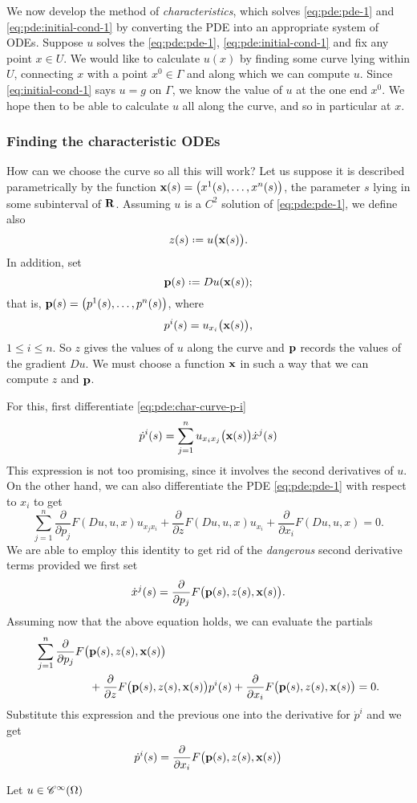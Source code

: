 We now develop the method of \emph{characteristics}, which solves
\eqref{eq:pde:pde-1} and \eqref{eq:pde:initial-cond-1} by converting the
PDE into an appropriate system of ODEs. Suppose \(u\) solves the
\eqref{eq:pde:pde-1}, \eqref{eq:pde:initial-cond-1} and fix any point
\(x\in U\). We would like to calculate \(u(x)\) by finding some curve lying
within \(U\), connecting \(x\) with a point \(x^0\in\Gamma\) and along
which we can compute \(u\). Since \eqref{eq:initial-cond-1} says \(u=g\) on
\(\Gamma\), we know the value of \(u\) at the one end \(x^0\). We hope then
to be able to calculate \(u\) all along the curve, and so in particular at
\(x\).
\subsubsection{Finding the characteristic ODEs}
How can we choose the curve so all this will work? Let us suppose it is
described parametrically by the function
\(\mathbf{x}(s)=\bigl(x^1(s),\dotsc,x^n(s)\bigr)\), the parameter \(s\) lying in
some subinterval of \(\mathbf{R}\). Assuming \(u\) is a \(C^2\) solution of
\eqref{eq:pde:pde-1}, we define also
\[
  z(s)\defeq u\bigl(\bfx(s)\bigr).
\]
In addition, set
\[
  \bfp(s)\defeq Du(\bfx(s));
\]
that is, \(\mathbf{p}(s)=\bigl(p^1(s),\dotsc,p^n(s)\bigr)\), where
\begin{equation}
  \label{eq:pde:char-curve-p-i}
  p^i(s)=u_{x_i}\bigl(\mathbf{x}(s)\bigr),
\end{equation}
\(1\leq i\leq n\). So \(z\) gives the values of \(u\) along the curve and
\(\mathbf{p}\) records the values of the gradient \(Du\). We must choose a
function \(\mathbf{x}\) in such a way that we can compute \(z\) and \(\mathbf{p}\).

For this, first differentiate \eqref{eq:pde:char-curve-p-i}
\[
  \dot{p}^i(s)=\sum_{j=1}^n u_{x_ix_j}\bigl(\mathbf{x}(s)\bigr)\dot{x}^j(s)
\]
This expression is not too promising, since it involves the second
derivatives of \(u\). On the other hand, we can also differentiate the PDE
\eqref{eq:pde:pde-1} with respect to \(x_i\) to get
\[
  \sum_{j=1}^n
  \frac{\partial}{\partial p_j}F(Du,u,x)u_{x_jx_i}
  +\frac{\partial}{\partial z}F(Du,u,x)u_{x_i}
  +\frac{\partial}{\partial x_i}F(Du,u,x)=0.
\]
We are able to employ this identity to get rid of the \emph{dangerous}
second derivative terms provided we first set
\[
  \dot{x}^j(s)=\frac{\partial}{\partial
    p_j}F\bigl(\mathbf{p}(s),z(s),\mathbf{x}(s)\bigr).
\]
Assuming now that the above equation holds, we can evaluate the partials
\[
  \begin{aligned}
    \sum_{j=1}^n\frac{\partial}{\partial
      p_j}F\bigl(&\mathbf{p}(s),z(s),\mathbf{x}(s)\bigr)\\
    &+\frac{\partial}{\partial z}F\bigl(\mathbf{p}(s),z(s),\mathbf{x}(s)\bigr)p^{i}(s)
    +\frac{\partial}{\partial x_i}F\bigl(\mathbf{p}(s),z(s),\mathbf{x}(s)\bigr)=0.
  \end{aligned}
\]
Substitute this expression and the previous one into the derivative for
\(\dot{p}^i\) and we get
\[
  \begin{aligned}
    \dot{p}^i(s)=\frac{\partial}{\partial x_i}F\bigl(\mathbf{p}(s),z(s),\mathbf{x}(s)\bigr)
  \end{aligned}
\]

Let \(u\in\mathscr{C}^\infty(\Omega)\)

